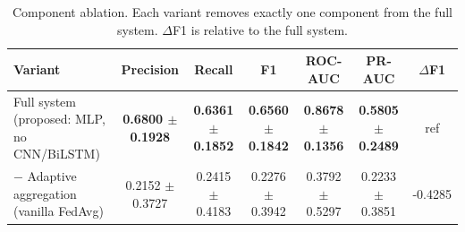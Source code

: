 \begin{table}[htbp]
\centering
\caption{Component ablation. Each variant removes exactly one component from the full system. $\Delta$F1 is relative to the full system.}
\label{tab:ablation}
\begin{tabular}{lcccccc}
\toprule
Variant & Precision & Recall & F1 & ROC-AUC & PR-AUC & $\Delta$F1 \\
\midrule
Full system (proposed: MLP, no CNN/BiLSTM) & \textbf{0.6800 $\pm$ 0.1928} & \textbf{0.6361 $\pm$ 0.1852} & \textbf{0.6560 $\pm$ 0.1842} & \textbf{0.8678 $\pm$ 0.1356} & \textbf{0.5805 $\pm$ 0.2489} & ref \\
− Adaptive aggregation (vanilla FedAvg) & 0.2152 $\pm$ 0.3727 & 0.2415 $\pm$ 0.4183 & 0.2276 $\pm$ 0.3942 & 0.3792 $\pm$ 0.5297 & 0.2233 $\pm$ 0.3851 & -0.4285 \\
\bottomrule
\end{tabular}
\end{table}